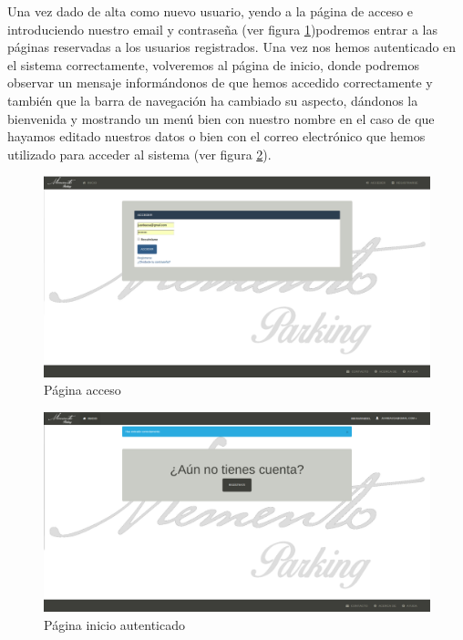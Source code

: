 Una vez dado de alta como nuevo usuario, yendo a la página de acceso e introduciendo nuestro email y contraseña (ver figura \ref{fig:sign_in})podremos entrar a las páginas reservadas a los usuarios registrados. Una vez nos hemos autenticado en el sistema correctamente, volveremos al página de inicio, donde podremos observar un mensaje informándonos de que hemos accedido correctamente y también que la barra de navegación ha cambiado su aspecto, dándonos la bienvenida y mostrando un menú bien con nuestro nombre en el caso de que hayamos editado nuestros datos o bien con el correo electrónico que hemos utilizado para acceder al sistema (ver figura \ref{fig:home_sign_in}).

	\begin{figure}[h!]
		\centering
		\includegraphics[width=15cm, fbox={\fboxrule} 4mm]{images/06-manual/03-sign_in.png}
		\caption{Página acceso}
		\label{fig:sign_in}
	\end{figure}
	
	\begin{figure}[h!]
		\centering
		\includegraphics[width=15cm, fbox={\fboxrule} 4mm]{images/06-manual/04-home_sign_in.png}
		\caption{Página inicio autenticado}
		\label{fig:home_sign_in}
	\end{figure}

